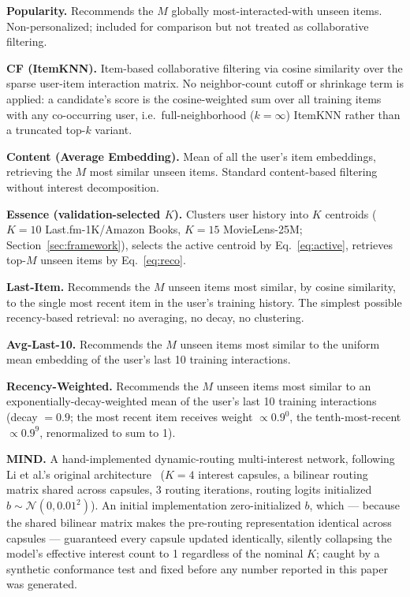 \documentclass{article}
\begin{document}
\textbf{Popularity.} Recommends the $M$ globally most-interacted-with unseen items. Non-personalized; included for comparison but not treated as collaborative filtering.

\textbf{CF (ItemKNN).} Item-based collaborative filtering via cosine similarity over the sparse user-item interaction matrix. No neighbor-count cutoff or shrinkage term is applied: a candidate's score is the cosine-weighted sum over all training items with any co-occurring user, i.e.\ full-neighborhood ($k=\infty$) ItemKNN rather than a truncated top-$k$ variant.

\textbf{Content (Average Embedding).} Mean of all the user's item embeddings, retrieving the $M$ most similar unseen items. Standard content-based filtering without interest decomposition.

\textbf{Essence (validation-selected $K$).} Clusters user history into $K$ centroids ($K=10$ Last.fm-1K/Amazon Books, $K=15$ MovieLens-25M; Section~\ref{sec:framework}), selects the active centroid by Eq.~\ref{eq:active}, retrieves top-$M$ unseen items by Eq.~\ref{eq:reco}.

\textbf{Last-Item.} Recommends the $M$ unseen items most similar, by cosine similarity, to the single most recent item in the user's training history. The simplest possible recency-based retrieval: no averaging, no decay, no clustering.

\textbf{Avg-Last-10.} Recommends the $M$ unseen items most similar to the uniform mean embedding of the user's last 10 training interactions.

\textbf{Recency-Weighted.} Recommends the $M$ unseen items most similar to an exponentially-decay-weighted mean of the user's last 10 training interactions (decay $=0.9$; the most recent item receives weight $\propto 0.9^{0}$, the tenth-most-recent $\propto 0.9^{9}$, renormalized to sum to 1).

\textbf{MIND.} A hand-implemented dynamic-routing multi-interest network, following Li et al.'s original architecture~\cite{li2019} ($K=4$ interest capsules, a bilinear routing matrix shared across capsules, 3 routing iterations, routing logits initialized $b \sim \mathcal{N}(0, 0.01^2)$). An initial implementation zero-initialized $b$, which --- because the shared bilinear matrix makes the pre-routing representation identical across capsules --- guaranteed every capsule updated identically, silently collapsing the model's effective interest count to 1 regardless of the nominal $K$; caught by a synthetic conformance test and fixed before any number reported in this paper was generated.
\end{document}

